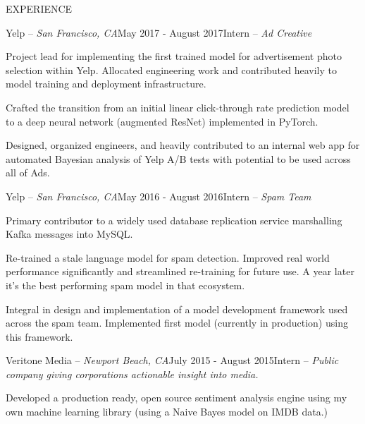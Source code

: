 \documentclass{resume} %
\begin{document}
 

\vspace{-1em}
\begin{rSection}{EXPERIENCE}

\begin{rSubsection}{Yelp -- {\it San Francisco, CA}}{May 2017 - August 2017}{Intern -- {\sl Ad Creative}}

\item Project lead for implementing the first trained model for advertisement photo selection
    within Yelp. Allocated engineering work and contributed heavily to model training and
    deployment infrastructure.
\item Crafted the transition from an initial linear click-through rate prediction model to
    a deep neural network (augmented ResNet) implemented in PyTorch.
\item Designed, organized engineers, and heavily contributed to an internal web app for
    automated Bayesian analysis of Yelp A/B tests with potential to be used across all of Ads.
\end{rSubsection}

\begin{rSubsection}{Yelp -- {\it San Francisco, CA}}{May 2016 - August 2016}{Intern -- {\sl Spam Team}}

\item Primary contributor to a widely used database replication service marshalling Kafka messages into MySQL.
\item Re-trained a stale language model for spam detection. Improved real world performance significantly
    and streamlined re-training for future use. A year later it's the best performing
    spam model in that ecosystem.
\item Integral in design and implementation of a model development framework used across the spam team. Implemented
    first model (currently in production) using this framework.
\end{rSubsection}

\begin{rSubsection}{Veritone Media -- {\it Newport Beach, CA}}{July 2015 - August 2015}{Intern -- {\sl Public company giving corporations actionable insight into media.}}

\item Developed a production ready, open source sentiment analysis engine using my own machine learning library (using a Naive Bayes model on IMDB data.)
\end{rSubsection}


\end{rSection}
\end{document}
